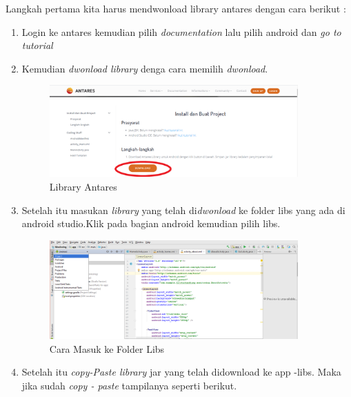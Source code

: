 \par Langkah pertama kita harus mendwonload library antares dengan cara berikut :
\begin{enumerate}
    \item Login ke antares kemudian pilih \textit{documentation} lalu pilih android dan \textit{go to tutorial}
    \item Kemudian \textit{dwonload library} denga cara memilih \textit{dwonload}.
    \begin{figure}[H]
        \centering
        \includegraphics[width=0.9\textwidth]{figures/android36.png}
        \caption{Library Antares}
        \label{print}
        \end{figure}
    \item Setelah itu masukan \textit{library} yang telah di\textit{dwonload} ke folder libs yang ada di android studio.Klik pada bagian android kemudian pilih libs.
    \begin{figure}[H]
        \centering
        \includegraphics[width=0.9\textwidth]{figures/android37.png}
        \caption{Cara Masuk ke Folder Libs}
        \label{print}
        \end{figure}
    \item Setelah itu \textit{copy-Paste library} jar yang telah didownload ke app -libs. Maka jika sudah \textit{copy - paste} tampilanya seperti berikut.
    \begin{figure}[H]
        \centering

\end{figure}
\end{enumerate}
